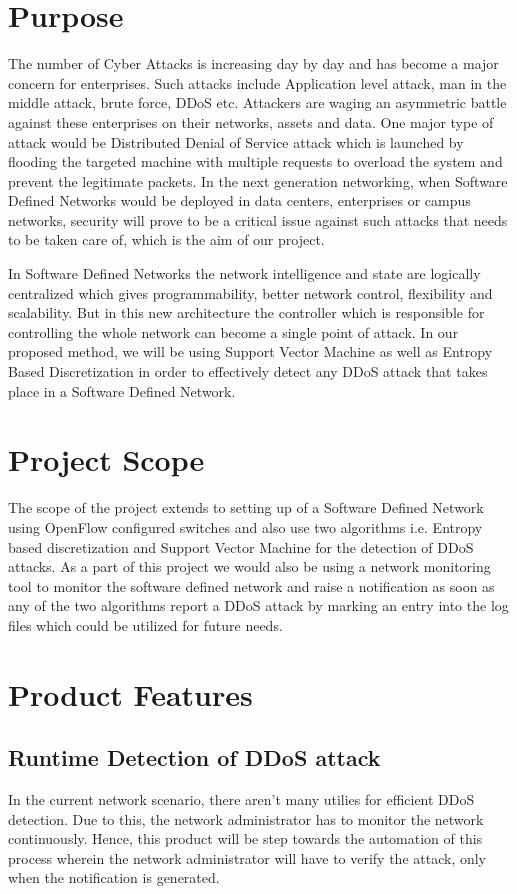 \documentclass[12pt,a4paper,final]{report}
\begin{document}
\section{Purpose}
The number of Cyber Attacks is increasing day by day and has become a major concern for enterprises. Such attacks include Application level attack, man in the middle attack, brute force, DDoS etc. Attackers are waging an asymmetric battle against these enterprises on their networks, assets and data. One major type of attack would be Distributed Denial of Service attack which is launched by flooding the targeted machine with multiple requests to overload the system and prevent the legitimate packets. In the next generation networking, when Software Defined Networks would be deployed in data centers, enterprises or campus networks, security will prove to be a critical issue against such attacks that needs to be taken care of, which is the aim of our project.

In Software Defined Networks the network intelligence and state are logically centralized which gives programmability, better network control, flexibility and scalability. But in this new architecture the controller which is responsible for controlling the whole network can become a single point of attack. In our proposed method, we will be using Support Vector Machine as well as Entropy Based Discretization in order to effectively detect any DDoS attack that takes place in a Software Defined Network.

\section{Project Scope}
The scope of the project extends to setting up of a Software Defined Network using OpenFlow configured switches and also use two algorithms i.e. Entropy based discretization and Support Vector Machine for the detection of DDoS attacks. As a part of this project we would also be using a network monitoring tool to monitor the software defined network and raise a notification as soon as any of the two algorithms report a DDoS attack by marking an entry into the log files which could be utilized for future needs.

\section{Product Features}
\subsection{Runtime Detection of DDoS attack}
In the current network scenario, there aren't many utilies for efficient DDoS detection. Due to this, the network administrator has to monitor the network continuously. Hence, this product will be step towards the automation of this process wherein the network administrator will have to verify the attack, only when the notification is generated.
\end{document}
